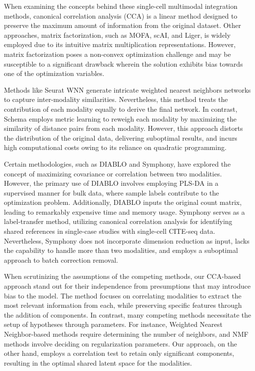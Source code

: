 When examining the concepts behind these single-cell multimodal integration methods, canonical correlation analysis (CCA) is a linear method designed to preserve the maximum amount of information from the original dataset. Other approaches, matrix factorization, such as MOFA, scAI, and Liger, is widely employed due to its intuitive matrix multiplication representations. However, matrix factorization poses a non-convex optimization challenge and may be susceptible to a significant drawback wherein the solution exhibits bias towards one of the optimization variables.

Methods like Seurat WNN generate intricate weighted nearest neighbors networks to capture inter-modality similarities. Nevertheless, this method treats the contribution of each modality equally to derive the final network. In contrast, Schema employs metric learning to reweigh each modality by maximizing the similarity of distance pairs from each modality. However, this approach distorts the distribution of the original data, delivering suboptimal results, and incurs high computational costs owing to its reliance on quadratic programming.

Certain methodologies, such as DIABLO and Symphony, have explored the concept of maximizing covariance or correlation between two modalities. However, the primary use of DIABLO involves employing PLS-DA in a supervised manner for bulk data, where sample labels contribute to the optimization problem. Additionally, DIABLO inputs the original count matrix, leading to remarkably expensive time and memory usage. Symphony serves as a label-transfer method, utilizing canonical correlation analysis for identifying shared references in single-case studies with single-cell CITE-seq data. Nevertheless, Symphony does not incorporate dimension reduction as input, lacks the capability to handle more than two modalities, and employs a suboptimal approach to batch correction removal.


When scrutinizing the assumptions of the competing methods, our CCA-based approach stand out for their independence from presumptions that may introduce bias to the model. The method focuses on correlating modalities to extract the most relevant information from each, while preserving specific features through the addition of components. In contrast, many competing methods necessitate the setup of hypotheses through parameters. For instance, Weighted Nearest Neighbor-based methods require determining the number of neighbors, and NMF methods involve deciding on regularization parameters. Our approach, on the other hand, employs a correlation test to retain only significant components, resulting in the optimal shared latent space for the modalities.

